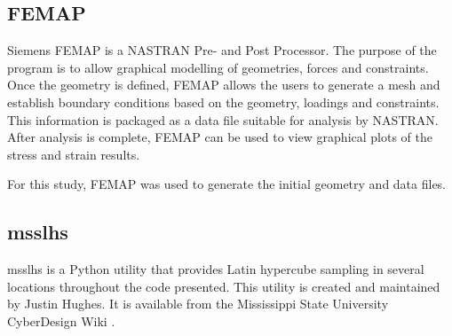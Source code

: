 \subsection{FEMAP}
Siemens FEMAP is a NASTRAN Pre- and Post Processor. The purpose of the program is to allow graphical modelling of geometries, forces and constraints. Once the geometry is defined, FEMAP allows the users to generate a mesh and establish boundary conditions based on the geometry, loadings and constraints. This information is packaged as a data file suitable for analysis by NASTRAN. After analysis is complete, FEMAP can be used to view graphical plots of the stress and strain results. 

For this study, FEMAP was used to generate the initial geometry and data files. 
\subsection{msslhs}

msslhs is a Python utility that provides Latin hypercube sampling in several locations throughout the code presented. This utility is created and maintained by Justin Hughes. It is available from the Mississippi State University CyberDesign Wiki \cite{msslhs}. 
